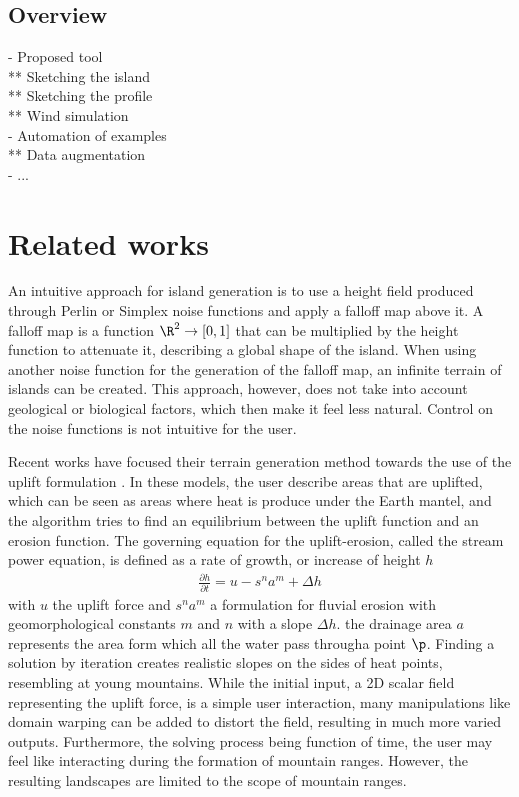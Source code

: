 \subsection{Overview}
- Proposed tool \\
** Sketching the island \\
** Sketching the profile \\
** Wind simulation \\
- Automation of examples \\
** Data augmentation \\
- ...

\section{Related works}
\label{sec:coral-island_related-works}
An intuitive approach for island generation is to use a height field produced through Perlin or Simplex noise functions and apply a falloff map above it. A falloff map is a function $\R^2 \to [0, 1]$ that can be multiplied by the height function to attenuate it, describing a global shape of the island. When using another noise function for the generation of the falloff map, an infinite terrain of islands can be created. This approach, however, does not take into account geological or biological factors, which then make it feel less natural. Control on the noise functions is not intuitive for the user.

Recent works have focused their terrain generation method towards the use of the uplift formulation \cite{Cordonnier2016,Cordonnier2017a,Schott2023,Tzathas2024}. In these models, the user describe areas that are uplifted, which can be seen as areas where heat is produce under the Earth mantel, and the algorithm tries to find an equilibrium between the uplift function and an erosion function. The governing equation for the uplift-erosion, called the stream power equation, is defined as a rate of growth, or increase of height $h$
\begin{align}
    \frac{\partial h}{\partial t} = u - s^n a^m + \Delta h
\end{align}
with $u$ the uplift force and $s^n a^m$ a formulation for fluvial erosion with geomorphological constants $m$ and $n$ with a slope $\Delta h$. the drainage area $a$ represents the area form which all the water pass througha point $\p$. Finding a solution by iteration creates realistic slopes on the sides of heat points, resembling at young mountains. While the initial input, a 2D scalar field representing the uplift force, is a simple user interaction, many manipulations like domain warping can be added to distort the field, resulting in much more varied outputs. Furthermore, the solving process being function of time, the user may feel like interacting during the formation of mountain ranges. However, the resulting landscapes are limited to the scope of mountain ranges.

